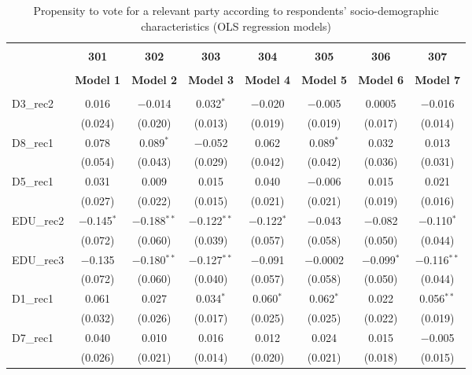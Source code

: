 \documentclass[
]{article}
\begin{document}
\begin{table}[!htbp] \centering 
  \caption{Propensity to vote for a relevant party according to respondents' 
                     socio-demographic characteristics (OLS regression models)} 
  \label{table:full_ols_bg} 
\begin{tabular}{@{\extracolsep{5pt}}lccccccc} 
\\[-1.8ex]\hline \\[-1.8ex] 
 & \textbf{301} & \textbf{302} & \textbf{303} & \textbf{304} & \textbf{305} & \textbf{306} & \textbf{307} \\ 
\\[-1.8ex] & \textbf{Model 1} & \textbf{Model 2} & \textbf{Model 3} & \textbf{Model 4} & \textbf{Model 5} & \textbf{Model 6} & \textbf{Model 7}\\ 
\hline \\[-1.8ex] 
 D3\_rec2 & 0.016 & $-$0.014 & 0.032$^{*}$ & $-$0.020 & $-$0.005 & 0.0005 & $-$0.016 \\ 
  & (0.024) & (0.020) & (0.013) & (0.019) & (0.019) & (0.017) & (0.014) \\ 
  D8\_rec1 & 0.078 & 0.089$^{*}$ & $-$0.052 & 0.062 & 0.089$^{*}$ & 0.032 & 0.013 \\ 
  & (0.054) & (0.043) & (0.029) & (0.042) & (0.042) & (0.036) & (0.031) \\ 
  D5\_rec1 & 0.031 & 0.009 & 0.015 & 0.040 & $-$0.006 & 0.015 & 0.021 \\ 
  & (0.027) & (0.022) & (0.015) & (0.021) & (0.021) & (0.019) & (0.016) \\ 
  EDU\_rec2 & $-$0.145$^{*}$ & $-$0.188$^{**}$ & $-$0.122$^{**}$ & $-$0.122$^{*}$ & $-$0.043 & $-$0.082 & $-$0.110$^{*}$ \\ 
  & (0.072) & (0.060) & (0.039) & (0.057) & (0.058) & (0.050) & (0.044) \\ 
  EDU\_rec3 & $-$0.135 & $-$0.180$^{**}$ & $-$0.127$^{**}$ & $-$0.091 & $-$0.0002 & $-$0.099$^{*}$ & $-$0.116$^{**}$ \\ 
  & (0.072) & (0.060) & (0.040) & (0.057) & (0.058) & (0.050) & (0.044) \\ 
  D1\_rec1 & 0.061 & 0.027 & 0.034$^{*}$ & 0.060$^{*}$ & 0.062$^{*}$ & 0.022 & 0.056$^{**}$ \\ 
  & (0.032) & (0.026) & (0.017) & (0.025) & (0.025) & (0.022) & (0.019) \\ 
  D7\_rec1 & 0.040 & 0.010 & 0.016 & 0.012 & 0.024 & 0.015 & $-$0.005 \\ 
  & (0.026) & (0.021) & (0.014) & (0.020) & (0.021) & (0.018) & (0.015) \\ 

\end{tabular}
\end{table}
\end{document}

